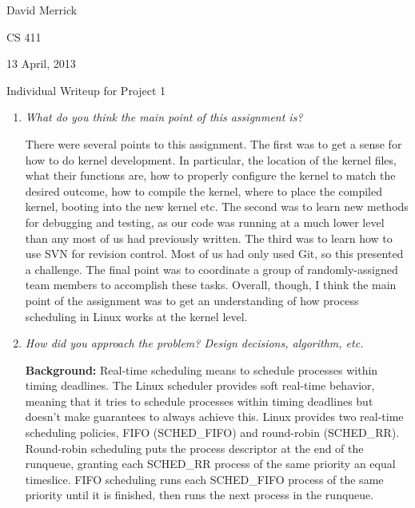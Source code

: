 \documentclass[letterpaper,10pt,titlepage]{article}
\newcommand{\ignore}[2]{\hspace{0in}#2} %
\newcommand{\tab}{\hspace*{2em}} %
\def\name{David Merrick}
\begin{document}
\name

CS 411

13 April, 2013

\begin{center}
{\LARGE Individual Writeup for Project 1}
\end{center}

\begin{enumerate} 
\item \emph{What do you think the main point of this assignment is?}

\tab There were several points to this assignment. The first was to get a sense for how to do kernel development. In particular, the location of the kernel files, what their functions are, how to properly configure the kernel to match the desired outcome, how to compile the kernel, where to place the compiled kernel, booting into the new kernel etc. The second was to learn new methods for debugging and testing, as our code was running at a much lower level than any most of us had previously written. The third was to learn how to use SVN for revision control. Most of us had only used Git, so this presented a challenge. The final point was to coordinate a group of randomly-assigned team members to accomplish these tasks. Overall, though, I think the main point of the assignment was to get an understanding of how process scheduling in Linux works at the kernel level.

\item \emph{How did you approach the problem? Design decisions, algorithm, etc.}

\tab \textbf{Background:} Real-time scheduling means to schedule processes within timing deadlines. The Linux scheduler provides soft real-time behavior, meaning that it tries to schedule processes within timing deadlines but doesn't make guarantees to always achieve this. Linux provides two real-time scheduling policies, FIFO (SCHED\_FIFO) and round-robin (SCHED\_RR)\ignore{[Source: Linux Kernel Development, pg. 64]}. Round-robin scheduling puts the process descriptor at the end of the runqueue, granting each SCHED\_RR process of the same priority an equal timeslice. FIFO scheduling runs each SCHED\_FIFO process of the same priority until it is finished, then runs the next process in the runqueue. \ignore{[Source: http://oreilly.com/catalog/linuxkernel/chapter/ch10.html]}


\end{enumerate}
\end{document}
